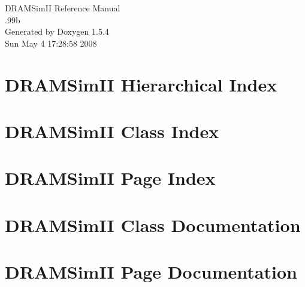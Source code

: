 \documentclass[a4paper]{book}
\begin{document}
\begin{titlepage}
\vspace*{7cm}
\begin{center}
{\Large DRAMSimII Reference Manual\\[1ex]\large .99b }\\
\vspace*{1cm}
{\large Generated by Doxygen 1.5.4}\\
\vspace*{0.5cm}
{\small Sun May 4 17:28:58 2008}\\
\end{center}
\end{titlepage}
\clearemptydoublepage
{}
\tableofcontents
\clearemptydoublepage
{}
\chapter{DRAMSimII Hierarchical Index}

\chapter{DRAMSimII Class Index}

\chapter{DRAMSimII Page Index}

\chapter{DRAMSimII Class Documentation}























\chapter{DRAMSimII Page Documentation}

\printindex
\end{document}
